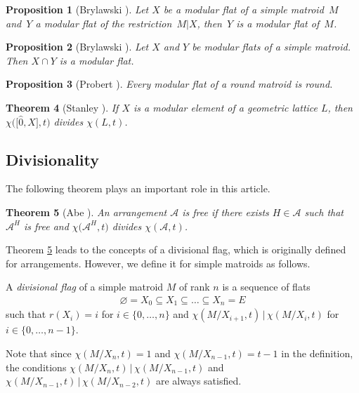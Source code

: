 \documentclass[pdftex]{sigma}
\numberwithin{equation}{section}
\newtheorem{Theorem}{Theorem}[section]
\newtheorem{Proposition}[Theorem]{Proposition}
 { \theoremstyle{definition}
\newtheorem{Definition}[Theorem]{Definition}
\newtheorem{Example}[Theorem]{Example}
\newtheorem{Remark}[Theorem]{Remark}
\newtheorem{Question}[Theorem]{Question} }
\begin{document}
\begin{Proposition}[Brylawski {\cite[Proposition 3.5]{brylawski1975modular-totams}}]\label{Brylawski modular tower}
Let $ X $ be a modular flat of a simple matroid~$ M $ and~$ Y $ a modular flat of the restriction~$ M|X $, then~$ Y $ is a modular flat of~$ M $.
\end{Proposition}

\begin{Proposition}[Brylawski {\cite[Proposition~3.6]{brylawski1975modular-totams}}]\label{Brylawski modular intersection}
Let $ X $ and $ Y $ be modular flats of a simple matroid.
Then $ X \cap Y $ is a modular flat.
\end{Proposition}

\begin{Proposition}[Probert {\cite[Corollary 4.2.8]{probert2018chordality}}]\label{Probert}
Every modular flat of a round matroid is round.
\end{Proposition}

\begin{Theorem}[Stanley {\cite[Theorem 2]{stanley1971modular-au}}]\label{stanley division}
If $ X $ is a modular element of a geometric lattice $ L $, then $ \chi\big(\big[\hat{0},X\big],t\big) $ divides $ \chi(L,t) $.
\end{Theorem}

\subsection{Divisionality}

The following theorem plays an important role in this article.
\begin{Theorem}[Abe {\cite[Theorem 1.1 (division theorem)]{abe2016divisionally-im}}]\label{Abe division}
An arrangement $ \mathcal{A} $ is free if there exists $ H \in \mathcal{A} $ such that $ \mathcal{A}^{H} $ is free and $ \chi\big(\mathcal{A}^{H},t\big) $ divides $ \chi(\mathcal{A},t) $.
\end{Theorem}

Theorem \ref{Abe division} leads to the concepts of a divisional flag, which is originally defined for arrangements.
However, we define it for simple matroids as follows.

\begin{Definition}\label{definition divisional flag}
A \textit{divisional flag} of a simple matroid $ M $ of rank $ n $ is a sequence of flats \begin{align*}
\varnothing = X_{0} \subseteq X_{1} \subseteq \dots \subseteq X_{n} = E
\end{align*}
such that $ r(X_{i}) = i $ for $ i \in \{0, \dots, n \} $ and $ \chi(M/X_{i+1},t) \,|\, \chi(M/X_{i}, t) $ for $ i \in \{0, \dots, n-1 \} $.
\end{Definition}
Note that since $ \chi(M/X_{n},t)=1 $ and $ \chi(M/X_{n-1},t) = t-1 $ in the definition, the conditions $ \chi(M/X_{n},t) \,|\, \chi(M/X_{n-1},t) $ and $ \chi(M/X_{n-1},t) \,|\, \chi(M/X_{n-2},t) $ are always satisfied.
\end{document}
